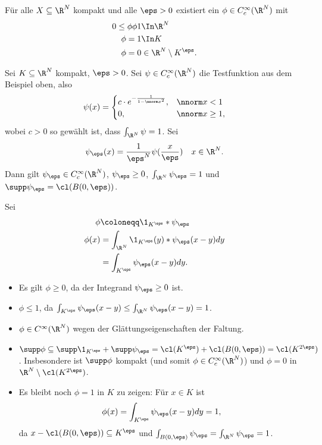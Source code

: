 \begin{lemma}
  Für alle $X \subseteq \R^{N}$ kompakt und alle $\eps > 0$ existiert ein $\phi \in C_{c}^{\infty}(\R^{N})$ mit
  \begin{align*}
    0\leq \phi \phi 1 & \In \R^{N}\\
\phi = 1& \In K\\
\phi = 0& \in \R^{N}\setminus K^{\eps}. 
  \end{align*}
\end{lemma}
\begin{beweis}
  Sei $K \subseteq \R^{N}$ kompakt, $\eps > 0$. Sei $\psi \in C_{c}^{\infty}(\R^{N})$ die Testfunktion aus dem Beispiel oben, also
  \begin{align*}
    \psi(x) =
    \begin{cases}
      c \cdot e^{- \frac 1 {1 - \nnorm x^{2}}}, & \nnorm x < 1\\
      0, & \nnorm x \geq 1, 
    \end{cases}
  \end{align*}
wobei $c > 0$ so gewählt ist, dass $\int_{\R^{N}}\psi = 1$. Sei 
\begin{align*}
  \psi_{\eps}(x) = \frac 1 {\eps^{N}}\psi(\frac x \eps) \quad x \in \R^{N}.
\end{align*}
Dann gilt $\psi_{\eps} \in C_{c}^{\infty}(\R^{N})$, $\psi_{\eps}\geq 0$, $\int_{\R^{N}}\psi_{\eps} = 1$ und $\supp \psi_{\eps} = \cl(B(0, \eps))$. 

Sei
\begin{align*}
  \phi &\coloneqq \1_{K^{\eps}}* \psi_{\eps}\\
  \phi(x) &=  \int_{\R^{N}} \1_{K^{\eps}}(y)* \psi_{\eps}(x-y) dy\\
 &=  \int_{K^{\eps}} \psi_{\eps}(x-y) dy. 
\end{align*}
\begin{itemize}
\item Es gilt $\phi \geq 0$, da der Integrand $\psi_{\eps}\geq 0$ ist.
\item $\phi \leq 1$, da $\int_{K^{\eps}}\psi_{\eps}(x - y)\leq \int_{\R^{N}}\psi_{\eps}(x - y) = 1$. 
\item $\phi \in C^{\infty}(\R^{N})$ wegen der Glättungseigenschaften der Faltung. 
\item $\supp \phi \subseteq \supp \1_{K^{\eps}} + \supp \psi_{\eps} = \cl(K^{\eps}) + \cl(B(0, \eps)) = \cl (K^{2 \eps})$. 
Insbesondere ist $\supp \phi$ kompakt (und somit $\phi \in C_{c}^{\infty}(\R^{N})$) und $\phi = 0$ in $\R^{N} \setminus \cl(K^{2 \eps})$. 
\item Es bleibt noch $\phi = 1$ in $K$ zu zeigen: Für $x \in K$ ist
  \begin{align*}
    \phi(x) = \int_{K^{\eps}} \psi_{\eps}(x-y)dy = 1, 
  \end{align*}
da $x - \cl(B(0, \eps)) \subseteq K^{\eps}$ und $\int_{B(0, \eps)} \psi_{\eps} = \int_{\R^{N}}\psi_{\eps} = 1$. 
\end{itemize}
\end{beweis}

